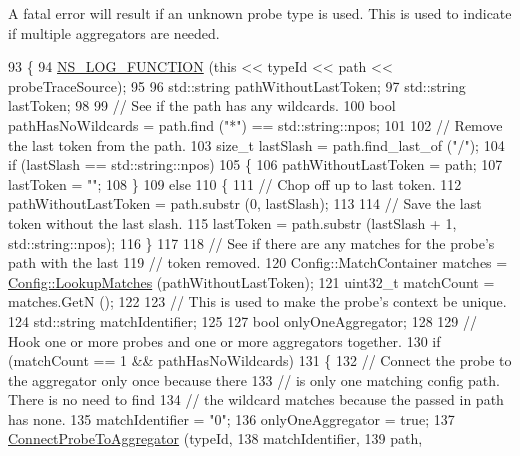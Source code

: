 A fatal error will result if an unknown probe type is used. This is used to indicate if multiple aggregators are needed. 
\begin{DoxyCode}
93 \{
94   \hyperlink{log-macros-disabled_8h_a90b90d5bad1f39cb1b64923ea94c0761}{NS\_LOG\_FUNCTION} (\textcolor{keyword}{this} << typeId << path << probeTraceSource);
95 
96   std::string pathWithoutLastToken;
97   std::string lastToken;
98 
99   \textcolor{comment}{// See if the path has any wildcards.}
100   \textcolor{keywordtype}{bool} pathHasNoWildcards = path.find (\textcolor{stringliteral}{"*"}) == std::string::npos;
101 
102   \textcolor{comment}{// Remove the last token from the path.}
103   \textcolor{keywordtype}{size\_t} lastSlash = path.find\_last\_of (\textcolor{stringliteral}{"/"});
104   \textcolor{keywordflow}{if} (lastSlash == std::string::npos)
105     \{
106       pathWithoutLastToken = path;
107       lastToken = \textcolor{stringliteral}{""};
108     \}
109   \textcolor{keywordflow}{else}
110     \{
111       \textcolor{comment}{// Chop off up to last token.}
112       pathWithoutLastToken = path.substr (0, lastSlash);
113 
114       \textcolor{comment}{// Save the last token without the last slash.}
115       lastToken = path.substr (lastSlash + 1, std::string::npos);
116     \}
117 
118   \textcolor{comment}{// See if there are any matches for the probe's path with the last}
119   \textcolor{comment}{// token removed.}
120   Config::MatchContainer matches = \hyperlink{group__config_ga74aeb63f8f50b4a98043351552ef7db6}{Config::LookupMatches} (pathWithoutLastToken);
121   uint32\_t matchCount = matches.GetN ();
122 
123   \textcolor{comment}{// This is used to make the probe's context be unique.}
124   std::string matchIdentifier;
125 
127   \textcolor{keywordtype}{bool} onlyOneAggregator;
128 
129   \textcolor{comment}{// Hook one or more probes and one or more aggregators together.}
130   \textcolor{keywordflow}{if} (matchCount == 1 && pathHasNoWildcards)
131     \{
132       \textcolor{comment}{// Connect the probe to the aggregator only once because there}
133       \textcolor{comment}{// is only one matching config path.  There is no need to find}
134       \textcolor{comment}{// the wildcard matches because the passed in path has none.}
135       matchIdentifier = \textcolor{stringliteral}{"0"};
136       onlyOneAggregator = \textcolor{keyword}{true};
137       \hyperlink{classns3_1_1FileHelper_af67443ae87a58eeaa0536b38e9349a07}{ConnectProbeToAggregator} (typeId,
138                                 matchIdentifier,
139                                 path,

\end{DoxyCode}
